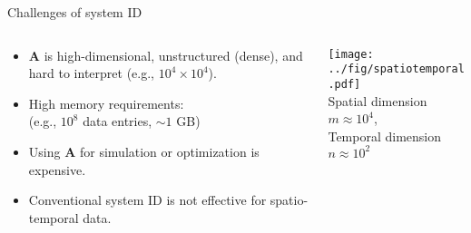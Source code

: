 \documentclass[10pt]{beamer}
\newcommand{\red}{\color{red}}
\newcommand{\UWred}{\color{UWRed}}
\newcommand{\bA}{\mathbf{A}}
\begin{document}
\begin{frame}{Challenges of system ID}
  
  \begin{columns}
    \begin{column}{0.5\textwidth}
      \begin{itemize}
      \item $\bA$ is { high-dimensional, unstructured (dense), and hard to interpret} (e.g., ${10^4\times 10^4}$).
        \vspace{0.2in}
      \item High memory requirements: \\
        (e.g., $10^8$ data entries, $\sim 1$ GB)
        \vspace{0.2in}
      \item Using $\mathbf{A}$ for simulation or optimization is expensive.
              \vspace{0.2in}
    \item \red Conventional system ID is not effective for spatio-temporal data.
      \end{itemize}
    \end{column}
    \begin{column}{0.45\textwidth}
      \texttt{[image: ../fig/spatiotemporal.pdf]}\\
      \vspace{0.1in}
      Spatial dimension $m\approx 10^4$, \\
      Temporal dimension $n\approx 10^2$
    \end{column}
  \end{columns}
\end{frame}
\end{document}
